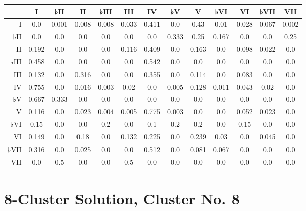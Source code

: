 \begin{table}[htbp]
\begin{minipage}{\linewidth}
\setlength{\tymax}{0.5\linewidth}
\centering
\small
\begin{tabulary}{\textwidth}{@{}RCCCCCCCCCCCC@{}} \toprule
&I&♭II&II&♭III&III&IV&♭V&V&♭VI&VI&♭VII&VII\\
\midrule
I&0.0&0.001&0.008&0.008&0.033&0.411&0.0&0.43&0.01&0.028&0.067&0.002\\
♭II&0.0&0.0&0.0&0.0&0.0&0.0&0.333&0.25&0.167&0.0&0.0&0.25\\
II&0.192&0.0&0.0&0.0&0.116&0.409&0.0&0.163&0.0&0.098&0.022&0.0\\
♭III&0.458&0.0&0.0&0.0&0.0&0.542&0.0&0.0&0.0&0.0&0.0&0.0\\
III&0.132&0.0&0.316&0.0&0.0&0.355&0.0&0.114&0.0&0.083&0.0&0.0\\
IV&0.755&0.0&0.016&0.003&0.02&0.0&0.005&0.128&0.011&0.043&0.02&0.0\\
♭V&0.667&0.333&0.0&0.0&0.0&0.0&0.0&0.0&0.0&0.0&0.0&0.0\\
V&0.116&0.0&0.023&0.004&0.005&0.775&0.003&0.0&0.0&0.052&0.023&0.0\\
♭VI&0.15&0.0&0.0&0.2&0.0&0.1&0.2&0.2&0.0&0.15&0.0&0.0\\
VI&0.149&0.0&0.18&0.0&0.132&0.225&0.0&0.239&0.03&0.0&0.045&0.0\\
♭VII&0.316&0.0&0.025&0.0&0.0&0.512&0.0&0.081&0.067&0.0&0.0&0.0\\
VII&0.0&0.5&0.0&0.0&0.5&0.0&0.0&0.0&0.0&0.0&0.0&0.0\\

\bottomrule

\end{tabulary}
\end{minipage}
\end{table}

\section{8-Cluster Solution, Cluster No. 8}
\label{8-clustersolutionclusterno.8}

